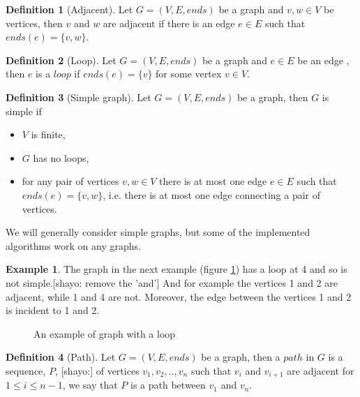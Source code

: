 \documentclass{report}
\theoremstyle{plain}
\theoremstyle{definition}
\newtheorem{definition}{Definition}
\newtheorem{example}{Example}
\theoremstyle{remark}
\numberwithin{definition}{chapter}
\numberwithin{example}{chapter}
\numberwithin{figure}{chapter}
\begin{document}
{\begin{definition}[Adjacent]
Let $G = (V, E, ends)$ be a graph and $v,w\in V$ be vertices, then $v$ and $w$ are adjacent if there is an edge $ e \in E$ such that $ends(e) = \{v, w\}$.
\end{definition}

\begin{definition}[Loop]
Let $G = (V, E, ends)$ be a graph and $e \in E$ be an edge , then $e$ is a $loop$ if $ends(e) = \{v\}$ for some vertex $v \in V$.
\end{definition}

\begin{definition}[Simple graph]
Let $G = (V, E, ends)$ be a graph, then $G$ is simple if
\begin{itemize}
\item $V$ is finite,
\item $G$ has no loops,
\item for any pair of vertices $v,w \in V$ there is at most one edge $e \in E$ such that $ends(e) = \{v, w\}$, i.e. there is at most one edge connecting a pair of vertices.
\end{itemize}
\end{definition}

We will generally consider simple graphs, but some of the implemented algorithms work on any graphs.

\begin{example}
The graph in the next example (figure \ref{loop}) has a loop at 4 and so is not simple.[shayo: remove the 'and'] And for example the vertices 1 and 2 are adjacent, while 1 and 4 are not. Moreover, the edge between the vertices 1 and 2 is incident to 1 and 2.
\begin{figure}[h]
\center
{}
\caption{An example of graph with a loop}
\label{loop}
\end{figure}
\end{example}

\begin{definition}[Path]
Let $G = (V, E, ends)$ be a graph, then a $path$ in $G$ is a sequence, $P$, [shayo:] of vertices $v_1,v_2,..,v_n$ such that $v_i$ and $v_{i+1}$ are adjacent for $1 \leq i \leq n - 1$, we say that $P$ is a path between $v_1$ and $v_n$.
\end{definition}

}
\end{document}
